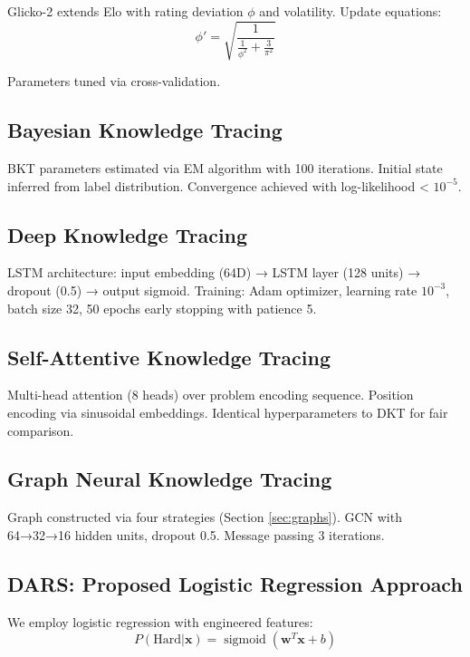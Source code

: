 \documentclass[conference]{IEEEtran}
\newcommand{\sigmoid}{\operatorname{sigmoid}}
\begin{document}
Glicko-2 extends Elo with rating deviation $\phi$ and volatility. Update equations:
\begin{equation}
\phi' = \sqrt{\frac{1}{\frac{1}{\phi^2} + \frac{3}{\pi^2}}}
\end{equation}

Parameters tuned via cross-validation.

\subsection{Bayesian Knowledge Tracing}

BKT parameters estimated via EM algorithm with 100 iterations. Initial state inferred from label distribution. Convergence achieved with log-likelihood < $10^{-5}$.

\subsection{Deep Knowledge Tracing}

LSTM architecture: input embedding (64D) → LSTM layer (128 units) → dropout (0.5) → output sigmoid. Training: Adam optimizer, learning rate $10^{-3}$, batch size 32, 50 epochs early stopping with patience 5.

\subsection{Self-Attentive Knowledge Tracing}

Multi-head attention (8 heads) over problem encoding sequence. Position encoding via sinusoidal embeddings. Identical hyperparameters to DKT for fair comparison.

\subsection{Graph Neural Knowledge Tracing}

Graph constructed via four strategies (Section \ref{sec:graphs}). GCN with 64→32→16 hidden units, dropout 0.5. Message passing 3 iterations.

\subsection{DARS: Proposed Logistic Regression Approach}

We employ logistic regression with engineered features:
\begin{equation}
P(\text{Hard} | \mathbf{x}) = \sigmoid(\mathbf{w}^T \mathbf{x} + b)
\end{equation}
\end{document}
